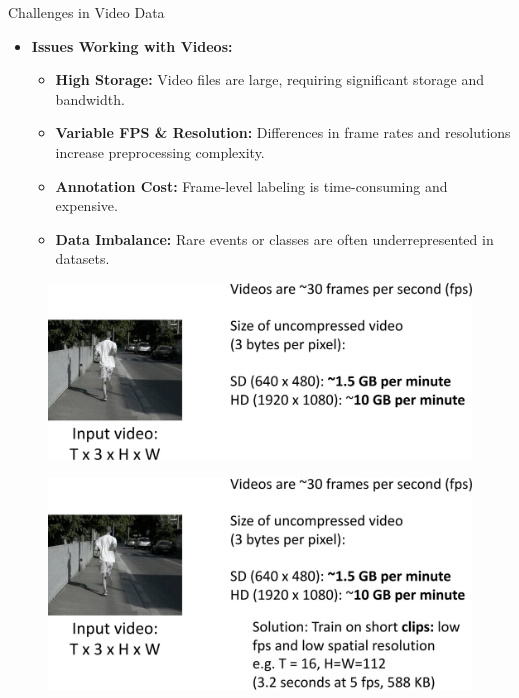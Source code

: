 \begin{frame}[allowframebreaks]{Challenges in Video Data}
    \begin{itemize}
        \item \textbf{Issues Working with Videos:}
        \begin{itemize}
            \item \textbf{High Storage:} Video files are large, requiring significant storage and bandwidth.
            \item \textbf{Variable FPS \& Resolution:} Differences in frame rates and resolutions increase preprocessing complexity.
            \item \textbf{Annotation Cost:} Frame-level labeling is time-consuming and expensive.
            \item \textbf{Data Imbalance:} Rare events or classes are often underrepresented in datasets.
        \end{itemize}
    \end{itemize}
\framebreak
    \begin{figure}
        \centering
        \includegraphics[width=1\textwidth,height=0.9\textheight,keepaspectratio]{images/video/slide_6_1_img.jpg}
    \end{figure}
\framebreak
    \begin{figure}
        \centering
        \includegraphics[width=1\textwidth,height=0.9\textheight,keepaspectratio]{images/video/slide_7_1_img.jpg}

\end{figure}
\end{frame}
